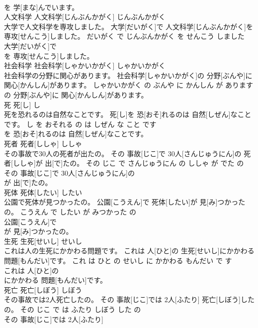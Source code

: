 \documentclass[8pt]{extreport}
\begin{document}
\begin{CJK}{UTF8}{min}
\\	を 学[まな]んでいます。			
\\	人文科学	人文科学[じんぶんかがく]	じんぶんかがく	
\\	大学で人文科学を専攻しました。	大学[だいがく]で 人文科学[じんぶんかがく]を 専攻[せんこう]しました。	だいがく で じんぶんかがく を せんこう しました	
\\	大学[だいがく]で
\\	を 専攻[せんこう]しました。			
\\	社会科学	社会科学[しゃかいかがく]	しゃかいかがく	
\\	社会科学の分野に関心があります。	社会科学[しゃかいかがく]の 分野[ぶんや]に 関心[かんしん]があります。	しゃかいかがく の ぶんや に かんしん が あります	
\\	の 分野[ぶんや]に 関心[かんしん]があります。			
\\	死	死[し]	し	
\\	死を恐れるのは自然なことです。	死[し]を 恐[おそ]れるのは 自然[しぜん]なことです。	し を おそれる の は しぜん な こと です	
\\	を 恐[おそ]れるのは 自然[しぜん]なことです。			
\\	死者	死者[ししゃ]	ししゃ	
\\	その事故で30人の死者が出たの。	その 事故[じこ]で 30人[さんじゅうにん]の 死者[ししゃ]が 出[で]たの。	その じこ で さんじゅうにん の ししゃ が でた の	
\\	その 事故[じこ]で 30人[さんじゅうにん]の
\\	が 出[で]たの。			
\\	死体	死体[したい]	したい	
\\	公園で死体が見つかったの。	公園[こうえん]で 死体[したい]が 見[み]つかったの。	こうえん で したい が みつかった の	
\\	公園[こうえん]で
\\	が 見[み]つかったの。			
\\	生死	生死[せいし]	せいし	
\\	これは人の生死にかかわる問題です。	これは 人[ひと]の 生死[せいし]にかかわる 問題[もんだい]です。	これ は ひと の せいし に かかわる もんだい で す	
\\	これは 人[ひと]の
\\	にかかわる 問題[もんだい]です。			
\\	死亡	死亡[しぼう]	しぼう	
\\	その事故では2人死亡したの。	その 事故[じこ]では 2人[ふたり] 死亡[しぼう]したの。	その じこ で は ふたり しぼう した の	
\\	その 事故[じこ]では 2人[ふたり]

\end{CJK}
\end{document}
